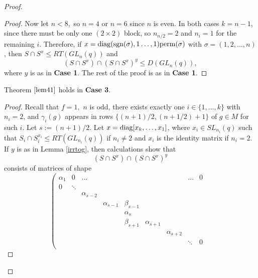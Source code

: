 \begin{proof}
\begin{proof}
Now let $n < 8,$ so $n=4$ or $n=6$ since $n$ is even. In both cases $k=n-1$, since there must be only one  $(2 \times 2)$ block, so $n_{n/2}=2$ and $n_i=1$ for the remaining $i.$ Therefore, if $x=\mathrm{diag}(\mathrm{sgn}(\sigma),1 \ldots, 1) \mathrm{perm}(\sigma)$ with $\sigma = (1, 2, \ldots, n )$, then $S \cap S^x \le RT(GL_n(q))$ and $$(S \cap S^x) \cap (S \cap S^x)^y \le D(GL_n(q)),$$
where $y$ is as in {\bf Case 1}. The rest of the proof is as in {\bf Case 1}. 
\end{proof}


\begin{Prop}
\label{case3prop}
 Theorem $\ref{lem41}$ holds in {\bf Case 3}.
\end{Prop}
\begin{proof}

 Recall that $f=1, $ $n$ is odd, there exists exactly one $i \in \{1, \ldots, k\}$ with $n_i=2$, and $\gamma_i(g)$ appears in rows  $\{(n+1)/2,(n+1/2)+1\}$ of $g \in M$ for such $i$. Let $s := (n + 1)/2$. Let $x= \mathrm{diag}[x_k, \ldots, x_1]$, where $x_i\in SL_{n_i}(q)$ such that $S_i \cap S_i^{x_i} \le RT(GL_{n_i}(q))$ if $n_i \ne 2$ and $x_i$ is the identity matrix if $n_i=2.$ If $y$ is as in Lemma \ref{irrtog}, then  calculations show that  
$$(S \cap S^x) \cap (S \cap S^x)^y$$ consists of matrices of shape 
\begin{equation}\label{sered2} 
  \left(\begin{smallmatrix} 
\alpha_1 &0       & \dots              &                  &                 &                   &  & \dots &0  \\
0        & \ddots &                    &                  &                 &                   &       & &  \\
         &        & \alpha_{s-2} &                  &                 &                   &       & &   \\
         &        &                    &\alpha_{s-1}&\beta_{s-1}&                   &       & &   \\
         &        &                    &                  &\alpha_{s} &                   &               &              &       &   \\
         &        &                    &                  &\beta_{s+1}&\alpha_{s+1} &              &       &   \\
         &        &                    &                    &               &                   &\alpha_{s+2}&       & \\
         &        &                    &                    &               &                   &              &\ddots & 0 \\

\end{smallmatrix}
\end{equation}
\end{proof}
\end{proof}
